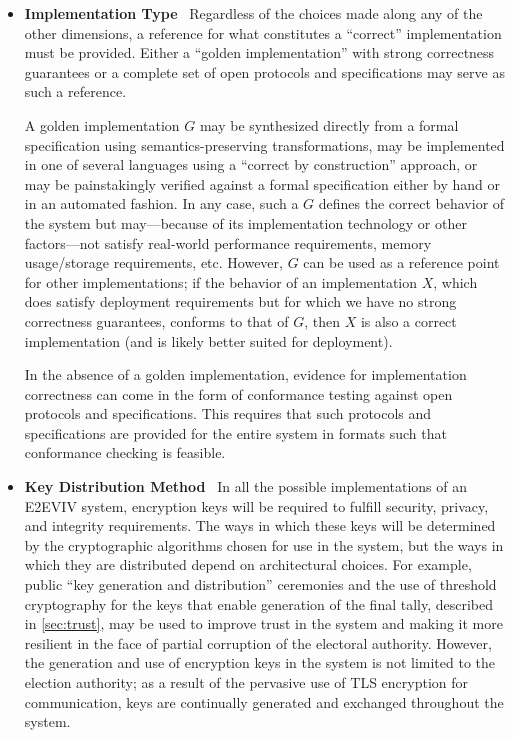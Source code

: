 \begin{itemize}
\item \textbf{Implementation Type} \ Regardless of the choices made
  along any of the other dimensions, a reference for what constitutes
  a ``correct'' implementation must be provided. Either a ``golden
  im\-ple\-men\-ta\-tion'' with strong correctness guarantees or a
  complete set of open protocols and specifications may serve as such
  a reference.

  A golden implementation $G$ may be synthesized directly from a
  formal specification using semantics-preserving transformations, may
  be implemented in one of several languages using a ``correct by
  construction'' approach, or may be painstakingly verified against a
  formal specification either by hand or in an automated fashion. In
  any case, such a $G$ defines the correct behavior of the system but
  may---because of its implementation technology or other
  factors---not satisfy real-world performance requirements, memory
  usage/storage requirements, etc.  However, $G$ can be used as a
  reference point for other implementations; if the behavior of an
  implementation $X$, which does satisfy deployment requirements but
  for which we have no strong correctness guarantees, conforms to that
  of $G$, then $X$ is also a correct implementation (and is likely
  better suited for deployment).

  In the absence of a golden implementation, evidence for
  implementation correctness can come in the form of conformance
  testing against open protocols and specifications. This requires
  that such protocols and specifications are provided for the entire
  system in formats such that conformance checking is feasible.

\item \textbf{Key Distribution Method} \ In all the possible
  implementations of an E2EVIV system, encryption keys will be
  required to fulfill security, privacy, and integrity
  requirements. The ways in which these keys will be determined by the
  cryptographic algorithms chosen for use in the system, but the ways
  in which they are distributed depend on architectural choices. For
  example, public ``key generation and distribution'' ceremonies and
  the use of threshold cryptography for the keys that enable
  generation of the final tally, described in \autoref{sec:trust}, may
  be used to improve trust in the system and making it more resilient
  in the face of partial corruption of the electoral
  authority. However, the generation and use of encryption keys in the
  system is not limited to the election authority; as a result of the
  pervasive use of TLS encryption for communication, keys are
  continually generated and exchanged throughout the system.


\end{itemize}

